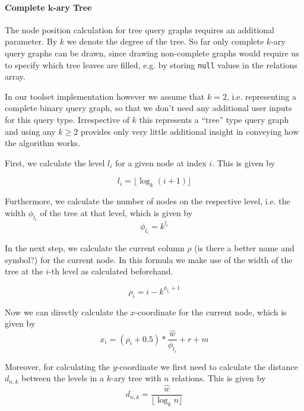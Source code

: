 \paragraph{Complete $\mathbf{k}$-ary Tree}

The node position calculation for tree query graphs requires an additional parameter. 
By $k$ we denote the degree of the tree. So far only complete $k$-ary query graphs can be drawn, since drawing non-complete graphs would require us to specify which tree leaves are filled, e.g. by storing \texttt{null} values in the relations array. 

\begin{note}
In our toolset implementation however we assume that $k = 2$, i.e. representing a complete binary query graph, so that we don't need any additional user inputs for this query type. Irrespective of $k$ this represents a ``tree'' type query graph and using any $k \geq 2$ provides only very little additional insight in conveying how the algorithm works.
\end{note}

First, we calculate the level $l_i$ for a given node at index $i$. This is given by

\begin{equation}
    \label{eq:qg-tree-level}
    l_i = \lfloor \log_{k}(i+1)\rfloor
\end{equation}

Furthermore, we calculate the number of nodes on the respective level, i.e. the width $\phi_{l_i}$ of the tree at that level, which is given by
\begin{equation}
    \phi_{l_i} = k^{l_i}
\end{equation}

In the next step, we calculate the current column $\rho$ (is there a better name and symbol?) for the current node. In this formula we make use of the width of the tree at the $i$-th level as calculated beforehand.

\begin{equation}
    \rho_{i} = i - k^{\phi_{l_i} + 1}
\end{equation}

Now we can directly calculate the $x$-coordinate for the current node, which is given by
\begin{equation}
    x_i = (\rho_{i} + 0.5) * \frac{\hat{w}}{\phi_{l_i}} + r + m
\end{equation}

Moreover, for calculating the $y$-coordinate we first need to calculate the distance $d_{n,k}$ between the levels in a $k$-ary tree with $n$ relations. This is given by
\begin{equation}
    d_{n,k} = \frac{\hat{w}}{\lfloor \log_k{n} \rfloor}
\end{equation}

